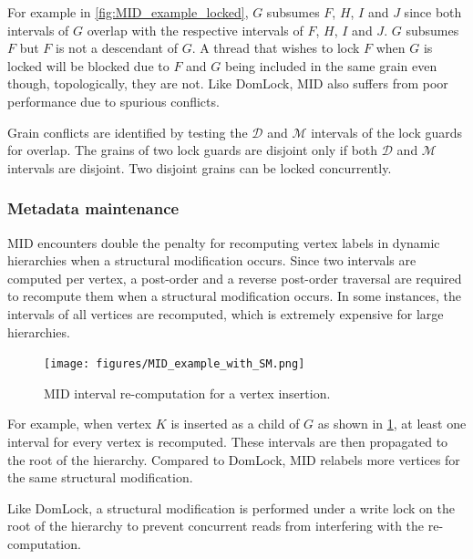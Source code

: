 For example in \cref{fig:MID_example_locked}, $G$ subsumes $F$, $H$, $I$ and $J$ since both intervals of $G$ overlap with the respective intervals of $F$, $H$, $I$ and $J$. $G$ subsumes $F$ but $F$ is not a descendant of $G$. A thread that wishes to lock $F$ when $G$ is locked will be blocked due to $F$ and $G$ being included in the same grain even though, topologically, they are not. Like DomLock, MID also suffers from poor performance due to spurious conflicts.

Grain conflicts are identified by testing the $\mathcal{D}$ and $\mathcal{M}$ intervals of the lock guards for overlap. The grains of two lock guards are disjoint only if both $\mathcal{D}$ and $\mathcal{M}$ intervals are disjoint. Two disjoint grains can be locked concurrently. 

\subsubsection{Metadata maintenance}

MID encounters double the penalty for recomputing vertex labels in dynamic hierarchies when a structural modification occurs. Since two intervals are computed per vertex, a post-order and a reverse post-order traversal are required to recompute them when a structural modification occurs. In some instances, the intervals of all vertices are recomputed, which is extremely expensive for large hierarchies.

\begin{figure}[H]
    \centering
    \captionsetup{justification=centering}
    \texttt{[image: figures/MID\_example\_with\_SM.png]}
    \caption{MID interval re-computation for a vertex insertion.}
    \label{fig:MID_example_SM}
    
\end{figure}

For example, when vertex $K$ is inserted as a child of $G$ as shown in \cref{fig:MID_example_SM}, at least one interval for every vertex is recomputed. These intervals are then propagated to the root of the hierarchy. Compared to DomLock, MID relabels more vertices for the same structural modification. 


Like DomLock, a structural modification is performed under a write lock on the root of the hierarchy to prevent concurrent reads from interfering with the re-computation.


